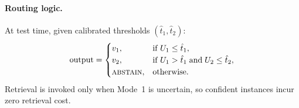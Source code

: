 \paragraph{Routing logic.}
At test time, given calibrated thresholds $(\hat{t}_1, \hat{t}_2)$:
\begin{equation}
\label{eq:routing}
  \text{output} =
  \begin{cases}
    v_1, & \text{if } U_1 \leq \hat{t}_1, \\
    v_2, & \text{if } U_1 > \hat{t}_1 \;\text{and}\; U_2 \leq \hat{t}_2, \\
    \textsc{abstain}, & \text{otherwise.}
  \end{cases}
\end{equation}
Retrieval is invoked only when Mode~1 is uncertain, so confident instances incur zero retrieval cost.

